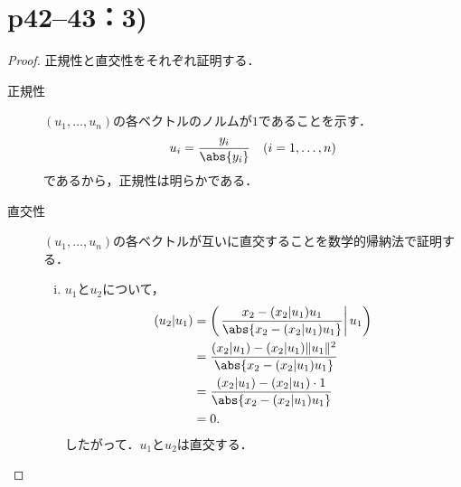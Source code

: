 \documentclass[a4paper,10pt,fleqn]{ltjsarticle}
\begin{document}
\section*{p42--43：3)}


\begin{tleftbar}
    \begin{proof}
        正規性と直交性をそれぞれ証明する．
        \begin{description}
            \item[正規性] $(u_1, \ldots, u_n)$の各ベクトルのノルムが$1$であることを示す．
                  \[
                      u_i = \frac{y_i}{\abs{y_i}} \quad (i = 1, \ldots, n)
                  \]
                  であるから，正規性は明らかである．
            \item[直交性] $(u_1, \ldots, u_n)$の各ベクトルが互いに直交することを数学的帰納法で証明する．
                  \begin{enumerate}[(i)]
                      \item $u_1$と$u_2$について，
                            \begin{align*}
                                (u_2 | u_1) & = \left(\left. \frac{x_2 - (x_2 | u_1) u_1}{\abs{ x_2 - (x_2 | u_1) u_1 }} \right|u_1 \right) \\
                                            & = \frac{(x_2 | u_1) - (x_2 | u_1) \|u_1\|^2}{\abs{ x_2 - (x_2 | u_1) u_1 }}                   \\
                                            & = \frac{(x_2 | u_1) - (x_2 | u_1) \cdot 1}{\abs{ x_2 - (x_2 | u_1) u_1 }}                     \\
                                            & = 0.
                            \end{align*}
                            したがって．$u_1$と$u_2$は直交する．


\end{enumerate}
\end{description}
\end{proof}
\end{tleftbar}
\end{document}
